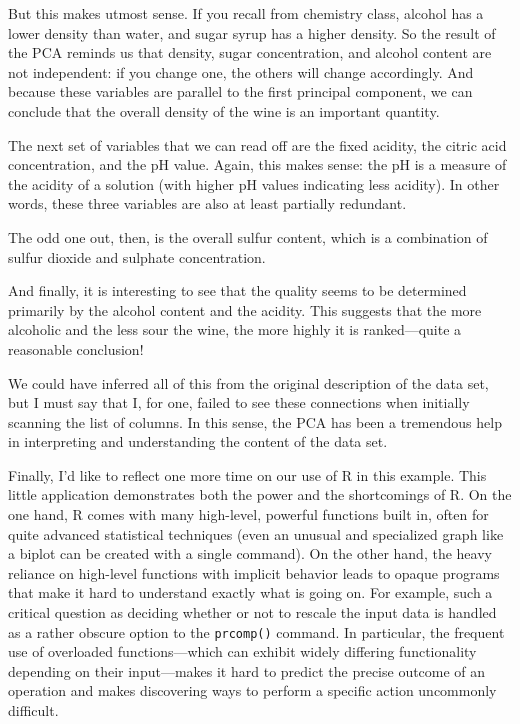 But this makes utmost sense. If you recall from chemistry class,
alcohol has a lower density than water, and sugar syrup has a
higher density. So the result of the PCA reminds us that density, sugar
concentration, and alcohol content are\vadjust{\pagebreak} not
independent: if you change one, the others will change accordingly.
And because these variables are parallel to the first principal
component, we can conclude that the overall density of the wine is an
important quantity.

The next set of variables that we can read off are the fixed acidity,
the citric acid concentration, and the pH value. Again, this makes
sense: the pH is a measure of the acidity of a solution (with higher
pH values indicating less acidity).  In other words, these three
variables are also at least partially redundant.

The odd one out, then, is the overall sulfur content, which is a
combination of sulfur dioxide and sulphate concentration.

And finally, it is interesting to see that the quality seems to be
determined primarily by the alcohol content and the acidity. This
suggests that the more alcoholic and the less sour the wine, the more
highly it is ranked---quite a reasonable conclusion!

We could have inferred all of this from the original description of
the data set, but I must say that I, for one, failed to see these
connections when initially scanning the list of columns. In this
sense, the PCA has been a tremendous help in interpreting and
understanding the content of the data set.

Finally, I'd like to reflect one more time on our use of R in this
example. This little application demonstrates both the power and the
shortcomings of R. On the one hand, R comes with many high-level,
powerful functions built in, often for quite advanced statistical
techniques (even an unusual and specialized graph like a biplot can be
created with a single command). On the other hand, the heavy reliance
on high-level functions with implicit behavior leads to opaque
programs that make it hard to understand exactly what is going on. For
example, such a critical question as deciding whether or not to
rescale the input data is handled as a rather obscure option to the
\texttt{prcomp()} command. In particular, the frequent use of
overloaded functions---which can exhibit widely differing
functionality depending on their input---makes it hard to predict the
precise outcome of an operation and makes discovering ways to perform
a specific action uncommonly difficult.


